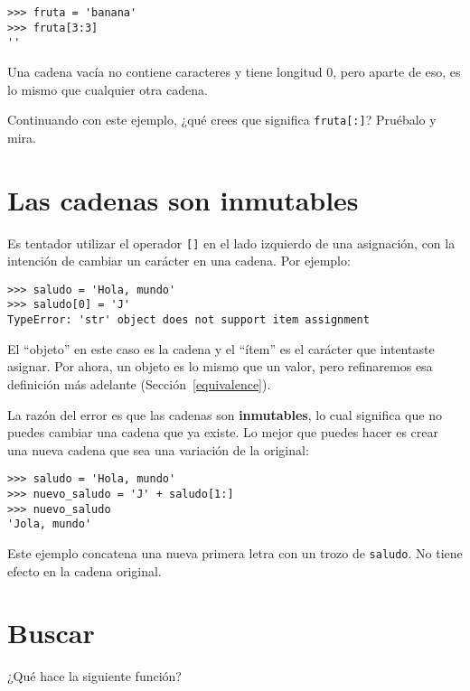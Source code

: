 \documentclass[10pt]{book}
\begin{document}
\begin{verbatim}
>>> fruta = 'banana'
>>> fruta[3:3]
''
\end{verbatim}
%
Una cadena vacía no contiene caracteres y tiene longitud 0, pero aparte
de eso, es lo mismo que cualquier otra cadena.

Continuando con este ejemplo, ¿qué crees que significa
{\tt fruta[:]}?  Pruébalo y mira.



\section{Las cadenas son inmutables}

Es tentador utilizar el operador {\tt []} en el lado izquierdo de una
asignación, con la intención de cambiar un carácter en una cadena.
Por ejemplo:

\begin{verbatim}
>>> saludo = 'Hola, mundo'
>>> saludo[0] = 'J'
TypeError: 'str' object does not support item assignment
\end{verbatim}
%
El ``objeto'' en este caso es la cadena y el ``ítem'' es
el carácter que intentaste asignar.  Por ahora, un objeto es
lo mismo que un valor, pero refinaremos esa definición
más adelante (Sección~\ref{equivalence}).

La razón del error es que
las cadenas son {\bf inmutables}, lo cual significa que no puedes cambiar una
cadena que ya existe.  Lo mejor que puedes hacer es crear una nueva cadena
que sea una variación de la original:

\begin{verbatim}
>>> saludo = 'Hola, mundo'
>>> nuevo_saludo = 'J' + saludo[1:]
>>> nuevo_saludo
'Jola, mundo'
\end{verbatim}
%
Este ejemplo concatena una nueva primera letra con
un trozo de {\tt saludo}.  No tiene efecto en
la cadena original.


\section{Buscar}
\label{find}

¿Qué hace la siguiente función?
\end{document}
